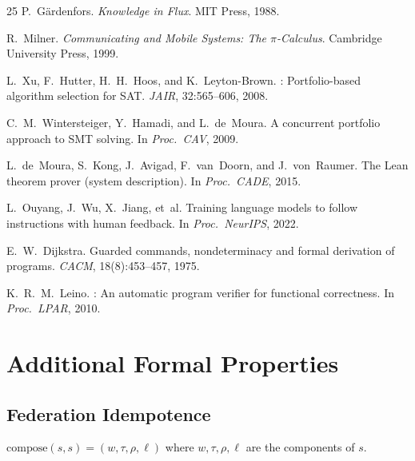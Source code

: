 \documentclass[11pt]{article}
\newcommand{\OracleComp}{\mathrm{compose}}
\begin{document}
\begin{thebibliography}{25}
P.~G{\"a}rdenfors.
\newblock \emph{Knowledge in Flux}.
\newblock MIT Press, 1988.

R.~Milner.
\newblock \emph{Communicating and Mobile Systems: The
  $\pi$-Calculus}.
\newblock Cambridge University Press, 1999.

L.~Xu, F.~Hutter, H.~H.~Hoos, and K.~Leyton-Brown.
: Portfolio-based algorithm selection for
  {SAT}.
\newblock \emph{JAIR}, 32:565--606, 2008.

C.~M.~Wintersteiger, Y.~Hamadi, and L.~de~Moura.
\newblock A concurrent portfolio approach to {SMT} solving.
\newblock In \emph{Proc.\ CAV}, 2009.

L.~de~Moura, S.~Kong, J.~Avigad, F.~van~Doorn, and
  J.~von~Raumer.
\newblock The {Lean} theorem prover (system description).
\newblock In \emph{Proc.\ CADE}, 2015.

L.~Ouyang, J.~Wu, X.~Jiang, et~al.
\newblock Training language models to follow instructions with
  human feedback.
\newblock In \emph{Proc.\ NeurIPS}, 2022.

E.~W.~Dijkstra.
\newblock Guarded commands, nondeterminacy and formal derivation
  of programs.
\newblock \emph{CACM}, 18(8):453--457, 1975.

K.~R.~M.~Leino.
: An automatic program verifier for functional
  correctness.
\newblock In \emph{Proc.\ LPAR}, 2010.

\end{thebibliography}

\appendix
\section{Additional Formal Properties}
\label{app:formal}

\subsection{Federation Idempotence}
\label{app:idemp}

\begin{lemma}
\label{lem:self-fed}
$\OracleComp(s, s) = (w, \tau, \rho, \ell)$ where $w, \tau, \rho, \ell$
are the components of $s$.
\end{lemma}
\end{document}
